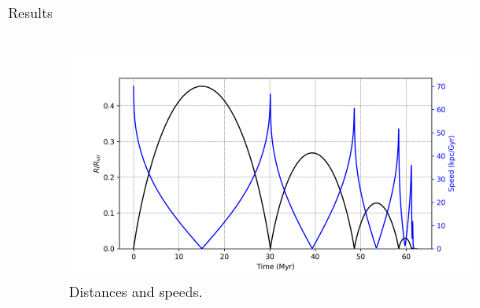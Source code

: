 \documentclass{beamer}
\begin{document}
\begin{frame}{Results}
\begin{columns}
\begin{column}{0.3\linewidth}
		\end{column}
		\begin{column}{0.7\linewidth}
			\begin{figure}[h]
				\centering
				\includegraphics[width = \linewidth]{"../Files/Week 6/properties_s02v70_1"}
				\caption{Distances and speeds.}
			\end{figure}
		\end{column}
	\end{columns}
\end{frame}
\end{document}
